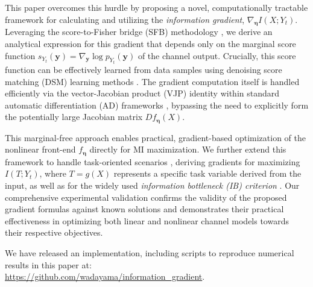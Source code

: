 \documentclass[conference]{IEEEtran}
\newcommand{\Yt}{Y_t}
\begin{document}
This paper overcomes this hurdle by proposing a novel, computationally 
tractable framework for calculating and utilizing the {\em information gradient}, 
$\nabla_{\bm \eta} I(X; Y_t)$. Leveraging the score-to-Fisher bridge (SFB) methodology \cite{wadayama2025}, 
we derive an analytical expression for this gradient  that depends only on the 
marginal score function $s_{Y_t}(\bm y) = \nabla_{\bm y} \log p_{Y_t}(\bm y)$ of the channel output.
Crucially, this score function can be effectively learned from data samples using 
denoising score matching (DSM) learning methods \cite{hyvarinen2005,vincent2011,song2019,song2021}.
The gradient computation itself is handled efficiently via the vector-Jacobian product (VJP) identity
within standard automatic differentiation (AD) 
frameworks \cite{Baydin2018}, bypassing the need to explicitly form the potentially large Jacobian 
matrix $Df_{\bm \eta}(X)$.

This marginal-free approach enables practical, 
gradient-based optimization of the nonlinear front-end $f_{\bm \eta}$ directly for MI maximization. 
We further extend this framework to handle task-oriented scenarios \cite{Gunduz2023}, 
deriving gradients for maximizing $I(T; Y_t)$, where $T=g(X)$ represents 
a specific task variable derived from the input, as well as for the widely used 
{\em information bottleneck (IB) criterion} \cite{Tishby1999}. 
Our comprehensive experimental validation confirms the validity of 
the proposed gradient formulas against known solutions and demonstrates 
their practical effectiveness in optimizing both linear and nonlinear channel 
models towards their respective objectives.


We have released an implementation, including scripts to reproduce numerical results 
in this paper at: \\ \url{https://github.com/wadayama/information_gradient}.



\end{document}
